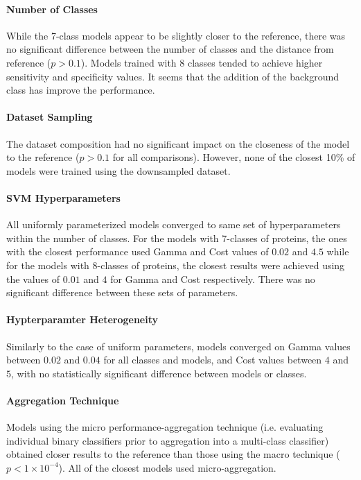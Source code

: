 \paragraph{Number of Classes}
While the 7-class models appear to be slightly closer to the reference, there was no significant difference between
the number of classes and the distance from reference ($p > 0.1$). Models trained with 8 classes tended to achieve
higher sensitivity and specificity values. It seems that the addition of the background class has improve the 
performance.

\paragraph{Dataset Sampling}
The dataset composition had no significant impact on the closeness of the model to the reference ($p > 0.1$ for all
comparisons). However, none of the closest 10\% of models were trained using the downsampled dataset.

\paragraph{SVM Hyperparameters}
All uniformly parameterized models converged to same set of hyperparameters within the number of classes. For the 
models with 7-classes of proteins, the ones with the closest performance used Gamma and Cost 
values of $0.02$ and $4.5$ while for the models with 8-classes of proteins, the closest results were achieved using 
the values of $0.01$ and $4$ for Gamma and Cost respectively. There was no significant difference between these 
sets of parameters.

\paragraph{Hypterparamter Heterogeneity}
Similarly to the case of uniform parameters, models converged on Gamma values between $0.02$ and $0.04$ for all classes
and models, and Cost values between $4$ and $5$, with no statistically significant difference between models or classes.

\paragraph{Aggregation Technique}
Models using the micro performance-aggregation technique (i.e. evaluating individual binary classifiers prior to
aggregation into a multi-class classifier) obtained closer results to the reference than those using the macro
technique ($p < 1\times 10^{-4}$). All of the closest models used micro-aggregation.

